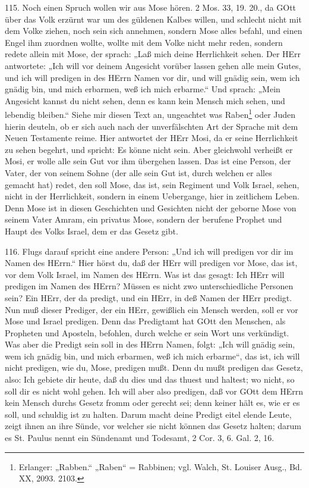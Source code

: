 115. Noch einen Spruch wollen wir aus Mose hören. 2 Mos. 33, 19. 20., da GOtt über das Volk erzürnt war um des güldenen Kalbes willen, und schlecht nicht mit dem Volke ziehen, noch sein sich annehmen, sondern Mose alles befahl, und einen Engel ihm zuordnen wollte, wollte mit dem Volke nicht mehr reden, sondern redete allein mit Mose, der sprach: „Laß mich deine Herrlichkeit
sehen. Der HErr antwortete: „Ich will vor deinem Angesicht vorüber lassen gehen alle mein Gutes, und ich will predigen in des HErrn Namen vor dir, und will gnädig sein, wem ich gnädig bin, und mich erbarmen, weß ich mich erbarme.“ Und sprach: „Mein Angesicht kannst du nicht sehen, denn es kann kein Mensch mich sehen, und lebendig bleiben.“ Siehe mir diesen Text an, ungeachtet was Raben\footnote{Erlanger: „Rabben.“ „Raben“ = Rabbinen; vgl. Walch, St. Louiser Ausg., Bd. XX, 2093. 2103.} oder Juden hierin deuteln, ob er sich auch nach der unverfälschten Art der Sprache mit dem Neuen Testamente reime. Hier antwortet der HErr Mosi, da er seine Herrlichkeit zu sehen begehrt, und spricht: Es könne nicht sein. Aber gleichwohl verheißt er Mosi, er wolle alle sein Gut vor ihm übergehen lassen. Das ist eine Person, der Vater, der von seinem Sohne (der alle sein Gut ist, durch welchen er alles gemacht hat) redet, den soll Mose, das ist, sein Regiment und Volk Israel, sehen, nicht in der Herrlichkeit, sondern in einem Uebergange, hier in zeitlichem Leben. Denn Mose ist in diesen Geschichten und Gesichten nicht der geborne Mose von seinem Vater Amram, ein privatus Mose, sondern der berufene Prophet und Haupt des Volks Israel, dem er das Gesetz gibt.

116. Flugs darauf spricht eine andere Person: „Und ich will predigen vor dir im Namen des HErrn.“ Hier hörst du, daß der HErr will predigen vor Mose, das ist, vor dem Volk Israel, im Namen des HErrn. Was ist das gesagt: Ich HErr will predigen im Namen des HErrn? Müssen es nicht zwo unterschiedliche Personen sein? Ein HErr, der da predigt, und ein HErr, in deß Namen der HErr predigt. Nun muß dieser Prediger, der ein HErr, gewißlich ein Mensch werden, soll er vor Mose und Israel predigen. Denn das Predigtamt hat GOtt den Menschen, als Propheten und Aposteln, befohlen, durch welche er sein Wort uns verkündigt. Was aber die Predigt sein soll in des HErrn Namen, folgt: „Ich will gnädig sein, wem ich gnädig bin, und mich erbarmen, weß ich mich erbarme“, das ist, ich will nicht predigen, wie du, Mose, predigen mußt. Denn du mußt predigen das Gesetz, also: Ich gebiete dir heute, daß du dies und das thuest und haltest; wo nicht, so soll dir es nicht wohl gehen. Ich will aber also predigen, daß vor GOtt dem HErrn kein Mensch durchs Gesetz fromm oder gerecht sei; denn keiner hält es, wie er es soll, und schuldig ist zu halten. Darum macht deine Predigt eitel elende Leute, zeigt ihnen an ihre Sünde, vor welcher sie nicht können das Gesetz halten; darum es St. Paulus nennt ein Sündenamt und Todesamt, 2 Cor. 3, 6. Gal. 2, 16.

